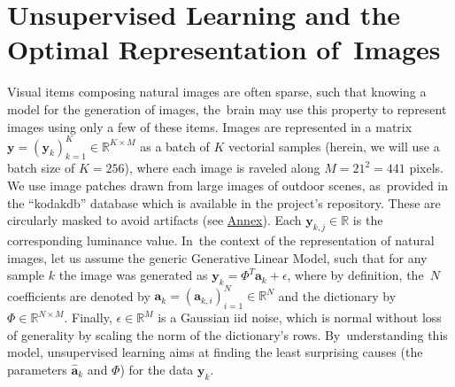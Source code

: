 \documentclass[vision,article,accept,oneauthor,pdftex]{Definitions/mdpi}
\newcommand{\coef}{\mathbf{a}} %
\newcommand{\image}{\mathbf{y}} %
\newcommand{\dico}{\Phi} %
\newcommand{\eqdef}{\ensuremath{\stackrel{\mbox{\upshape\tiny def.}}{=}}}
\newcommand{\RR}{\mathbb{R}}
\begin{document}
\section{Unsupervised Learning and the Optimal Representation of~Images}%
%
%
%
Visual items composing natural images are often sparse, such that knowing a model for the generation of images, the~brain may use this property to represent images using only a few of these items.
Images are represented in a matrix $\image = (\image_k)_{k=1}^K \in \RR^{K \times M}$ as a batch of $K$ vectorial samples (herein, we will use a batch size of $K=256$), where each image is raveled along $M = 21^2 = 441$ pixels. We use image patches drawn from large images of outdoor scenes, as~provided in the ``kodakdb'' database which is available in the project's repository. These are circularly masked to avoid artifacts (see \href{https://spikeai.github.io/HULK/#Loading-a-database}{Annex}). Each $\image_{k, j} \in \RR$ is the corresponding luminance value. In~the context of the representation of natural images, let us assume the generic Generative Linear Model, such that for any sample $k$ the image was generated as $\image_k = \dico^T \coef_{k} + \epsilon $, where by definition, the~$N$ coefficients are denoted by $\coef_{k} = (\coef_{k, i})_{i=1}^N \in \RR^{N}$ and the dictionary by $\dico \in \RR^{N \times M}$. Finally, $\epsilon \in \RR^{M}$ is a Gaussian iid noise, which is normal without loss of generality by scaling the norm of the dictionary's rows. By~understanding this model, unsupervised learning aims at finding the least surprising causes (the parameters $\hat{\coef}_{k}$ and $\dico$) for the data $\image_k$.
\end{document}
